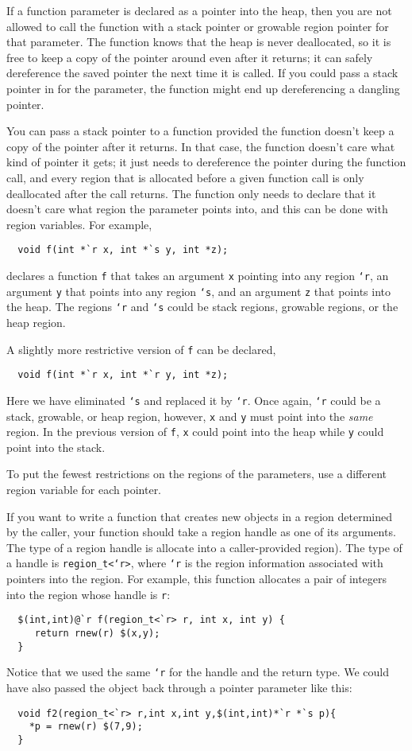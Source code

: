 If a function parameter is declared as a pointer into the heap, then
you are not allowed to call the function with a stack pointer or
growable region pointer for that parameter.  The function knows that
the heap is never deallocated, so it is free to keep a copy of the
pointer around even after it returns; it can safely dereference the saved
pointer the next time it is called.  If you could pass a stack pointer
in for the parameter, the function might end up dereferencing a
dangling pointer.

You can pass a stack pointer to a function provided the function
doesn't keep a copy of the pointer after it returns.  In that case,
the function doesn't care what kind of pointer it gets; it just needs
to dereference the pointer during the function call, and every region
that is allocated before a given function call is only deallocated
after the call returns.  The function only needs to declare that it
doesn't care what region the parameter points into, and this can be
done with region variables.  For example,
\begin{verbatim}
  void f(int *`r x, int *`s y, int *z);
\end{verbatim}
declares a function \texttt{f} that takes an argument \texttt{x}
pointing into any region \texttt{`r}, an argument \texttt{y} that
points into any region \texttt{`s}, and an argument \texttt{z} that
points into the heap.  The regions \texttt{`r} and \texttt{`s} could
be stack regions, growable regions, or the heap region.

A slightly more restrictive version of \texttt{f} can be declared,
\begin{verbatim}
  void f(int *`r x, int *`r y, int *z);
\end{verbatim}
Here we have eliminated \texttt{`s} and replaced it by \texttt{`r}.
Once again, \texttt{`r} could be a stack, growable, or heap region,
however, \texttt{x} and \texttt{y} must point into the \emph{same}
region.  In the previous version of \texttt{f}, \texttt{x} could point
into the heap while \texttt{y} could point into the stack.

To put the fewest restrictions on the regions of the parameters, use a
different region variable for each pointer.

If you want to write a function that creates new objects in a region
determined by the caller, your function should take a region handle as
one of its arguments.  The type of a region handle is allocate into a
caller-provided region).  The type of a handle is
\texttt{region_t<`r>}, where \texttt{`r} is the region information
associated with pointers into the region.  For example, this function
allocates a pair of integers into the region whose handle is
\texttt{r}:
\begin{verbatim}
  $(int,int)@`r f(region_t<`r> r, int x, int y) { 
     return rnew(r) $(x,y);
  }
\end{verbatim}
Notice that we used the same \texttt{`r} for the handle and the return
type.  We could have also passed the object back through a pointer
parameter like this:
\begin{verbatim}
  void f2(region_t<`r> r,int x,int y,$(int,int)*`r *`s p){ 
    *p = rnew(r) $(7,9); 
  }
\end{verbatim}

